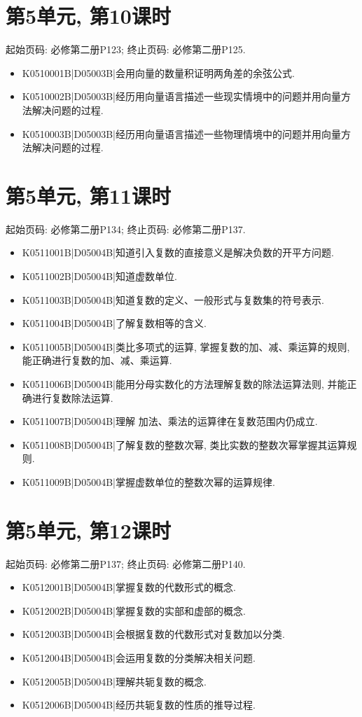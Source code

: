 \section*{第5单元, 第10课时}
起始页码: 必修第二册P123; 终止页码: 必修第二册P125.
\begin{itemize}
\item K0510001B|D05003B|会用向量的数量积证明两角差的余弦公式.
\item K0510002B|D05003B|经历用向量语言描述一些现实情境中的问题并用向量方法解决问题的过程.
\item K0510003B|D05003B|经历用向量语言描述一些物理情境中的问题并用向量方法解决问题的过程.
\end{itemize}

\section*{第5单元, 第11课时}
起始页码: 必修第二册P134; 终止页码: 必修第二册P137.
\begin{itemize}
\item K0511001B|D05004B|知道引入复数的直接意义是解决负数的开平方问题.
\item K0511002B|D05004B|知道虚数单位.
\item K0511003B|D05004B|知道复数的定义、一般形式与复数集的符号表示.
\item K0511004B|D05004B|了解复数相等的含义.
\item K0511005B|D05004B|类比多项式的运算, 掌握复数的加、减、乘运算的规则, 能正确进行复数的加、减、乘运算.
\item K0511006B|D05004B|能用分母实数化的方法理解复数的除法运算法则, 并能正确进行复数除法运算.
\item K0511007B|D05004B|理解 加法、乘法的运算律在复数范围内仍成立.
\item K0511008B|D05004B|了解复数的整数次幂, 类比实数的整数次幂掌握其运算规则.
\item K0511009B|D05004B|掌握虚数单位的整数次幂的运算规律.
\end{itemize}

\section*{第5单元, 第12课时}
起始页码: 必修第二册P137; 终止页码: 必修第二册P140.
\begin{itemize}
\item K0512001B|D05004B|掌握复数的代数形式的概念.
\item K0512002B|D05004B|掌握复数的实部和虚部的概念.
\item K0512003B|D05004B|会根据复数的代数形式对复数加以分类.
\item K0512004B|D05004B|会运用复数的分类解决相关问题.
\item K0512005B|D05004B|理解共轭复数的概念.
\item K0512006B|D05004B|经历共轭复数的性质的推导过程.
\end{itemize}


